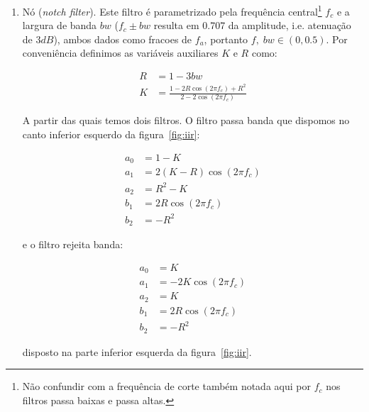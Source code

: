 \begin{enumerate}
\item Nó (\emph{notch filter}). Este filtro é parametrizado
pela frequência central\footnote{Não
confundir com a frequência de corte também notada aqui por $f_c$ nos filtros passa baixas e passa altas.} $f_c$
e a largura de banda $bw$
($f_c \pm bw$ resulta em 0.707 da amplitude, i.e. atenuação de $3dB$),
ambos dados como fracoes de $f_a$, portanto $f,\; bw \in (0,0.5)$.
Por conveniência definimos as variáveis auxiliares $K$ e $R$ como:

\begin{equation}
\begin{split}
R & = 1 - 3bw \\
K & = \frac{1-2R\cos(2\pi f_c) + R^2}{2 - 2 \cos (2 \pi f_c)}
\end{split}
\end{equation}

A partir das quais temos dois filtros. O filtro passa banda que dispomos no canto inferior esquerdo da figura~\ref{fig:iir}:

\begin{equation}\label{eq:passa-banda}
\begin{split}
a_0 & =  1 - K \\
a_1 & =  2(K-R)\cos (2\pi f_c) \\
a_2 & =  R^2-K \\
b_1 & =  2R \cos (2\pi f_c) \\
b_2 & =  -R^2
\end{split}
\end{equation}

e o filtro rejeita banda:

\begin{equation}\label{eq:rejeita-banda}
\begin{split}
a_0 & =  K \\
a_1 & =  -2K\cos (2\pi f_c) \\
a_2 & =  K \\
b_1 & =  2R \cos (2\pi f_c) \\
b_2 & =  -R^2
\end{split}
\end{equation}

disposto na parte inferior esquerda da figura~\ref{fig:iir}.


\end{enumerate}

